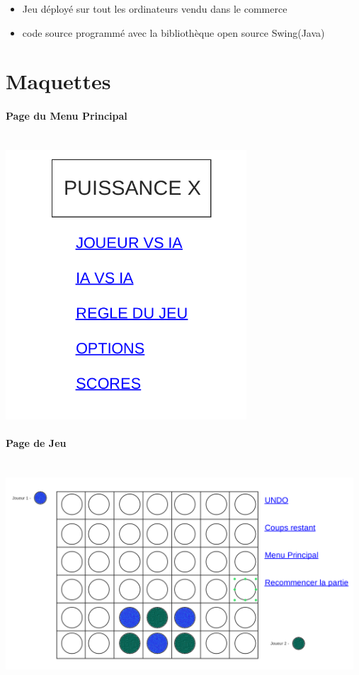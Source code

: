 \documentclass[a4paper,oneside]{article}
\begin{document}
\begin{itemize}
    \item Jeu déployé sur tout les ordinateurs vendu dans le commerce
    \item code source programmé avec la bibliothèque open source Swing(Java)
\end{itemize}







\section{Maquettes}

\paragraph{Page du Menu Principal}

~\\

\includegraphics[width=9cm]{image2.png}

\paragraph{Page de Jeu}

~\\

\includegraphics[width=13cm]{image1.png}





\label{fin}
\end{document}
